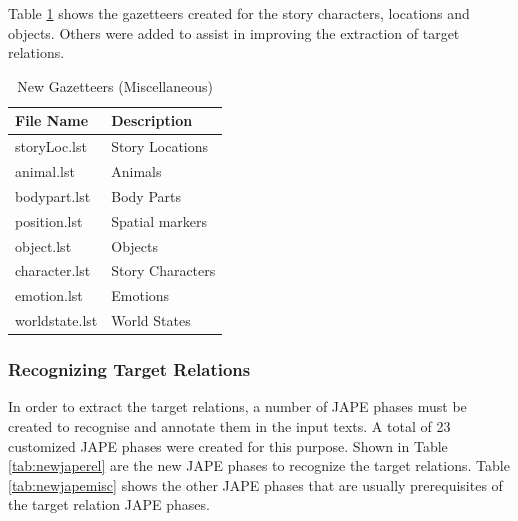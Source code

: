 Table \ref{tab:newgazetteersstory} shows the gazetteers created for the story characters, locations and objects. Others were added to assist in improving the extraction of target relations.

\begin{table}[H]   %
\centering
\caption{New Gazetteers (Miscellaneous)} \vspace{0.25em}
\begin{tabular}{|p{5cm}|p{5cm}|} \hline
\textbf{File Name} & \textbf{Description} \\ \hline
storyLoc.lst		& Story Locations \\ \hline
animal.lst			& Animals \\ \hline
bodypart.lst		& Body Parts \\ \hline
position.lst		& Spatial markers \\ \hline
object.lst			& Objects \\ \hline
character.lst		& Story Characters \\ \hline
emotion.lst			& Emotions \\ \hline
worldstate.lst 		& World States \\ \hline
\end{tabular}
\label{tab:newgazetteersstory}
\end{table}

\subsubsection{Recognizing Target Relations}
\label{sec:recogtarget}

In order to extract the target relations, a number of JAPE phases must be created to recognise and annotate them in the input texts. A total of 23 customized JAPE phases were created for this purpose. Shown in Table \ref{tab:newjaperel} are the new JAPE phases to recognize the target relations. Table \ref{tab:newjapemisc} shows the other JAPE phases that are usually prerequisites of the target relation JAPE phases.

